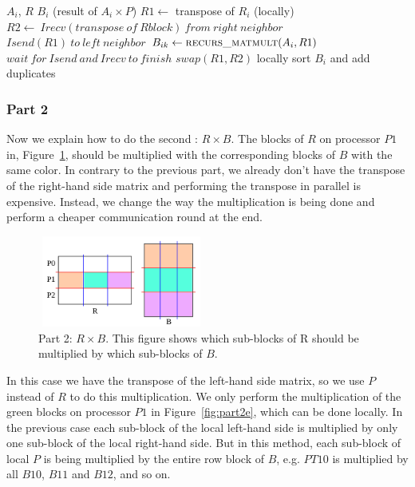 \begin{algorithm}[H] 
  \caption{Part 1: $B_i = A_i \times P$} \label{alg:part1} 
  \begin{algorithmic}[1]
    \Require $A_i$, $R$
    \Ensure  $B_i$ (result of $A_i \times P$)
    \State $R1 \leftarrow$ transpose of $R_i$ (locally)
      \State $R2 \leftarrow\ Irecv(transpose\ of\ R block)\ from\ right\ neighbor$
      \State $Isend(R1)\ to\ left\ neighbor$
      \State $B_{ik} \leftarrow \textsc{recurs\_matmult}(A_i, R1)$ 
      \State $wait\ for\ Isend\ and\ Irecv\ to\ finish$
      \State $swap(R1,R2)$
    \EndFor
    \State locally sort $B_i$ and add duplicates
  \end{algorithmic}
\end{algorithm}


\subsubsection{Part 2}

Now we explain how to do the second \mm: $R \times B$. The blocks of $R$ on processor $P1$ in, Figure~\ref{fig:part2d}, should be multiplied with the corresponding blocks of $B$ with the same color. In contrary to the previous part, we already don't have the transpose of the right-hand side matrix and performing the transpose in parallel is expensive. Instead, we change the way the multiplication is being done and perform a cheaper communication round at the end.

\begin{figure}[tbh]
 \centering
 \includegraphics[width=5.5cm,height=3cm]{./figures/part2d.pdf}
 \caption{Part 2: $R \times B$. This figure shows which sub-blocks of R should be multiplied by which sub-blocks of $B$.}
 \label{fig:part2d}
\end{figure}

In this case we have the transpose of the left-hand side matrix, so we use $P$ instead of $R$ to do this multiplication.
We only perform the multiplication of the green blocks on processor $P1$ in Figure~\ref{fig:part2e}, which can be done locally.
%
In the previous case each sub-block of the local left-hand side is multiplied by only one sub-block of the local right-hand side.
But in this method, each sub-block of local $P$ is being multiplied by the entire row block of $B$, e.g. $PT10$ is multiplied by all $B10$, $B11$ and $B12$, and so on.

